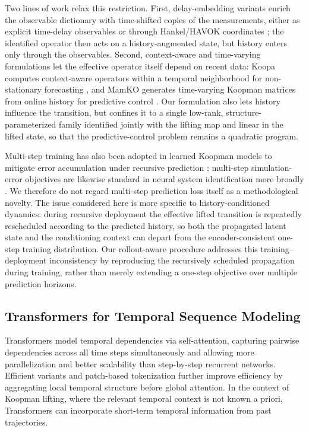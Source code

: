 Two lines of work relax this restriction. First, delay-embedding variants enrich the observable dictionary with time-shifted copies of the measurements, either as explicit time-delay observables \cite{kamb2020timedelay} or through Hankel/HAVOK coordinates \cite{brunton2017chaos, arbabi2017ergodic, das2019delay}; the identified operator then acts on a history-augmented state, but history enters only through the observables. Second, context-aware and time-varying formulations let the effective operator itself depend on recent data: Koopa computes context-aware operators within a temporal neighborhood for non-stationary forecasting \cite{liu2023koopa}, and MamKO generates time-varying Koopman matrices from online history for predictive control \cite{li2025mamko}. Our formulation also lets history influence the transition, but confines it to a single low-rank, structure-parameterized family identified jointly with the lifting map and linear in the lifted state, so that the predictive-control problem remains a quadratic program.

Multi-step training has also been adopted in learned Koopman models to mitigate error accumulation under recursive prediction \cite{lusch2018deep, otto2019linearly, azencot2020forecasting, wu2026multistep}; multi-step simulation-error objectives are likewise standard in neural system identification more broadly \cite{forgione2021dynonet}. We therefore do not regard multi-step prediction loss itself as a methodological novelty. The issue considered here is more specific to history-conditioned dynamics: during recursive deployment the effective lifted transition is repeatedly rescheduled according to the predicted history, so both the propagated latent state and the conditioning context can depart from the encoder-consistent one-step training distribution. Our rollout-aware procedure addresses this training--deployment inconsistency by reproducing the recursively scheduled propagation during training, rather than merely extending a one-step objective over multiple prediction horizons.

\subsection{Transformers for Temporal Sequence Modeling}

Transformers \cite{vaswani2017attention} model temporal dependencies via self-attention, capturing pairwise dependencies across all time steps simultaneously and allowing more parallelization and better scalability than step-by-step recurrent networks. Efficient variants and patch-based tokenization \cite{zhou2021informer, wang2020linformer, choromanski2021performer, wu2021autoformer, zhou2022fedformer, nie2023time} further improve efficiency by aggregating local temporal structure before global attention. In the context of Koopman lifting, where the relevant temporal context is not known a priori, Transformers can incorporate short-term temporal information from past trajectories.

